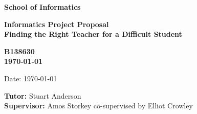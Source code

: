 \documentclass[a4paper,11pt]{article}
\newcommand{\examnumber}{B138630}
\newcommand{\field}{Finding the Right Teacher for a Difficult Student}
\newcommand{\tutor}{Stuart Anderson}
\newcommand{\supervisor}{Amos Storkey co-supervised by Elliot Crowley}
\begin{document}
\begin{minipage}[b]{110mm}
        {\Huge\bf School of Informatics
        \vspace*{17mm}}
\end{minipage}
\hfill
\begin{minipage}[t]{40mm}               
\end{minipage}
\par\noindent
\vspace*{2cm}
\begin{center}
        \Large\bf Informatics Project Proposal \\
        \Large\bf \field
\end{center}
\vspace*{1.5cm}
\begin{center}
        \bf \examnumber\\
        \monthyeardate\today
\end{center}
\vspace*{5mm}

%
%                       
\begin{abstract}
        Network distillation can improve the performance of a neural network through distilling the knowledge of a teacher network into a student. The teacher network is usually large and deep, whilst the student is much smaller. Typically, network distillation is effective where the teacher and student architectures are standard, off-the-shelf architectures. This proposal suggests an investigation into network distillation techniques in cases where the student network is of some non-standard architecture developed through Neural Architecture Search. We suggest experimental work investigating the performance of standard teachers for non-standard students, as well as work on modelling a teacher from a given student.
\end{abstract}

\vspace*{1cm}

\vspace*{3cm}
Date: \today

\vfill
{\bf Tutor:} \tutor\\
{\bf Supervisor:} \supervisor
\newpage

\setcounter{page}{1}                            %
\footruleheight{1pt}
\headruleheight{1pt}
\rhead{- \thepage}
\cfoot{}
%
\tableofcontents                                %
\end{document}

